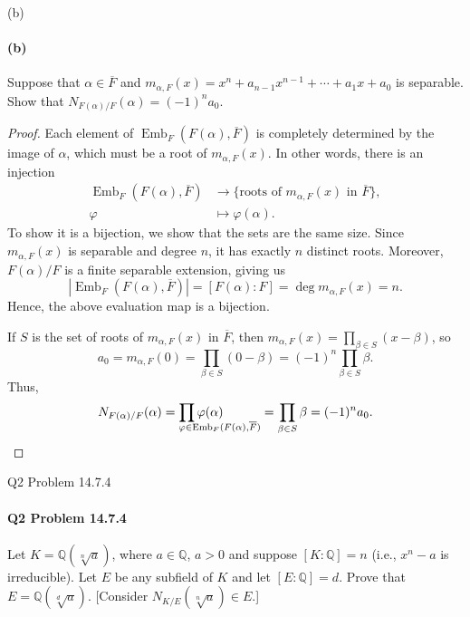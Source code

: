 \documentclass[12pt]{article}
\makeatletter
\newenvironment{fullbox}{\begin{lrbox}{\savefullbox}\begin{minipage}{\dimexpr\textwidth-2\fboxsep\relax}}{\end{minipage}\end{lrbox}\begin{center}\framebox[\textwidth]{\usebox{\savefullbox}}\end{center}}
\newenvironment{pbox}[1][]{\begin{fullbox}\ifx#1\empty\else\paragraph{#1}\fi}{\end{fullbox}}
\newcommand{\Q}{\mathbb{Q}}
\renewcommand{\phi}{\varphi}
\newcommand{\<}{\langle}
\renewcommand{\>}{\rangle}
\newcommand{\clo}{\overline}
\DeclareMathOperator{\Emb}{Emb}
\newcommand\myprod[2]{
    \begin{array}[t]{@{}l@{}}
        {\displaystyle\prod #2} \\[-3pt] \scriptstyle #1 
    \end{array}
}
\makeatother
\begin{document}
\newpage
\begin{pbox}[(b)]
    Suppose that $\alpha \in \clo{F}$ and $m_{\alpha, F}(x) = x^n + a_{n-1} x^{n-1} + \cdots + a_1x + a_0$ is separable. Show that $N_{F(\alpha)/F}(\alpha) = (-1)^n a_0$.
\end{pbox}

\begin{proof}
    Each element of $\Emb_F(F(\alpha), \clo{F})$ is completely determined by the image of $\alpha$, which must be a root of $m_{\alpha, F}(x)$. In other words, there is an injection
    \begin{align*}
        \Emb_F(F(\alpha), \clo{F}) &\to \{\text{roots of } m_{\alpha, F}(x) \text{ in } \clo{F}\}, \\
            \phi &\mapsto \phi(\alpha).
    \end{align*}
    To show it is a bijection, we show that the sets are the same size. Since $m_{\alpha, F}(x)$ is separable and degree $n$, it has exactly $n$ distinct roots. Moreover, $F(\alpha)/F$ is a finite separable extension, giving us
    \[
        |\Emb_F(F(\alpha), \clo{F})|
            = [F(\alpha) : F]
            = \deg m_{\alpha, F}(x)
            = n.
    \]
    Hence, the above evaluation map is a bijection.

    If $S$ is the set of roots of $m_{\alpha, F}(x)$ in $\clo{F}$, then $m_{\alpha, F}(x) = \prod_{\beta \in S} (x - \beta)$, so
    \[
        a_0 
            = m_{\alpha, F}(0) 
            = \prod_{\beta \in S} (0 - \beta) 
            = (-1)^n \prod_{\beta \in S} \beta.
    \]
    Thus,
    \[
        N_{F(\alpha)/F}(\alpha)
            = \myprod{\phi \in \Emb_F(F(\alpha), \clo{F})}{\phi(\alpha)}
            = \prod_{\beta \in S} \beta
            = (-1)^n a_0.
    \]


\end{proof}
    


\newpage
\begin{pbox}[Q2 Problem 14.7.4]
    Let $K = \Q(\sqrt[n]{a})$, where $a \in \Q$, $a > 0$ and suppose $[K : \Q] = n$ (i.e., $x^n - a$ is irreducible). Let $E$ be any subfield of $K$ and let $[E : \Q] = d$. Prove that $E = \Q(\sqrt[d]{a})$. [Consider $N_{K/E}(\sqrt[n]{a}) \in E$.]
\end{pbox}
    
\end{document}
